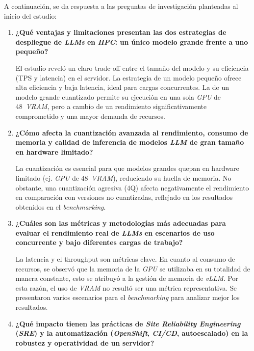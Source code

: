 A continuación, se da respuesta a las preguntas de investigación planteadas al inicio del estudio:

\begin{enumerate}
    \item \textbf{¿Qué ventajas y limitaciones presentan las dos estrategias de despliegue de \textit{LLMs} en \textit{HPC}: un único modelo grande frente a uno pequeño?}
    
    El estudio reveló un claro trade-off entre el tamaño del modelo y su eficiencia (TPS y latencia) en el servidor. La estrategia de un modelo pequeño ofrece alta eficiencia y baja latencia, ideal para cargas concurrentes. La de un modelo grande cuantizado permite su ejecución en una sola \textit{GPU} de 48~\textit{VRAM}, pero a cambio de un rendimiento significativamente comprometido y una mayor demanda de recursos.

    \item \textbf{¿Cómo afecta la cuantización avanzada al rendimiento, consumo de memoria y calidad de inferencia de modelos \textit{LLM} de gran tamaño en hardware limitado?}
    
    La cuantización es esencial para que modelos grandes quepan en hardware limitado (ej. \textit{GPU} de 48~\textit{VRAM}), reduciendo su huella de memoria. No obstante, una cuantización agresiva (4Q) afecta negativamente el rendimiento en comparación con versiones no cuantizadas, reflejado en los resultados obtenidos en el \textit{benchmarking}.

    \item \textbf{¿Cuáles son las métricas y metodologías más adecuadas para evaluar el rendimiento real de \textit{LLMs} en escenarios de uso concurrente y bajo diferentes cargas de trabajo?}
    
    La latencia y el throughput son métricas clave. En cuanto al consumo de recursos, se observó que la memoria de la \textit{GPU} se utilizaba en su totalidad de manera constante, esto se atribuyó a la gestión de memoria de \textit{vLLM}. Por esta razón, el uso de \textit{VRAM} no resultó ser una métrica representativa. Se presentaron varios escenarios para el \textit{benchmarking} para analizar mejor los resultados.

    \item \textbf{¿Qué impacto tienen las prácticas de \textit{Site Reliability Engineering} (\textit{SRE}) y la automatización (\textit{OpenShift}, \textit{CI/CD}, autoescalado) en la robustez y operatividad de un servidor?}
    

\end{enumerate}
